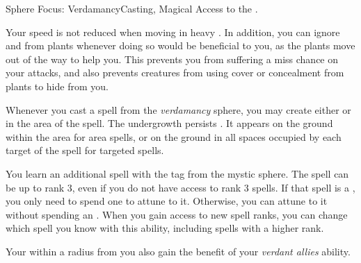     \begin{magicalfeat}{Sphere Focus: Verdamancy}{Casting, Magical}
        \featpre Access to the  .

         Your speed is not reduced when moving in heavy .
        In addition, you can ignore  and  from plants whenever doing so would be beneficial to you, as the plants move out of the way to help you.
        This prevents you from suffering a miss chance on your attacks, and also prevents creatures from using cover or concealment from plants to hide from you.

         Whenever you cast a spell from the \textit{verdamancy} sphere, you may create either  or  in the area of the spell.
        The undergrowth persists .
        It appears on the ground within the area for area spells, or on the ground in all spaces occupied by each target of the spell for targeted spells.

         You learn an additional spell with the  tag from the  mystic sphere.
        The spell can be up to rank 3, even if you do not have access to rank 3 spells.
        If that spell is a , you only need to spend one  to attune to it.
        Otherwise, you can attune to it without spending an .
        When you gain access to new spell ranks, you can change which spell you know with this ability, including spells with a higher rank.

         Your  within a \largearea radius  from you also gain the benefit of your \textit{verdant allies} ability.
    \end{magicalfeat}

